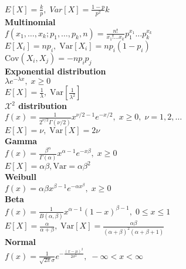\documentclass[10pt]{article} %
\begin{document}
\begin{multicols}{4}
{    \)\\
    \(
    E[X] = \frac{k}{p},\; Var[X] = \frac{1-p}{p^2}k
    \)\\
    {\small \textbf{Multinomial}}\\
    \(
    f(x_1,\dots,x_k;p_1,\dots,p_k,n) = \frac{n!}{x_1!\hdots x_k}p_1^{x_1}\hdots p_k^{x_k}
    \)\\
    \(
    E[X_i] = np_i,\; \text{Var}[X_i] = np_i(1-p_i)
    \)\\
    \(
    \text{Cov}(X_i,X_j) =-np_ip_j
    \)\\
    {\small \textbf{Exponential distribution}}\\
    \(
    \lambda e^{-\lambda x},\; x\geq 0
    \)\\
    \(
    E[X] = \frac{1}{\lambda},\; \text{Var}[\frac{1}{\lambda^2}]
    \)\\
    {\small \textbf{\(\mathcal{X}^2\) distribution}}\\
    {\small
    \(
    f(x) = \frac{1}{2^{\nu/2}\Gamma(\nu/2)}x^{\nu/2-1}e^{-x/2},\; x \geq 0,\; \nu = 1,2,\dots
    \)
    }\\
    \(
    E[X] = \nu,\; \text{Var}[X] = 2\nu
    \)\\
    {\small \textbf{Gamma}}\\
    \(
    f(x)=\frac{\beta^\alpha}{\Gamma(\alpha)} x^{\alpha-1}e^{-x\beta}, \; x \geq 0
    \)\\
    \(
    E[X] = \alpha\beta, \text{Var} = \alpha\beta^2
    \)\\
    {\small \textbf{Weibull}}\\
    \(
    f(x) = \alpha\beta x^{\beta-1}e^{-\alpha x^{\beta}},\; x \geq 0
    \)\\
    {\small \textbf{Beta}}\\
    \(
    f(x) = \frac{1}{B(\alpha,\beta)}x^{\alpha-1}(1-x)^{\beta-1},\; 0 \leq x \leq 1
    \)\\
    \(
    E[X] = \frac{\alpha}{\alpha+\beta},\; \text{Var}[X] = \frac{\alpha\beta}{(\alpha+\beta)^2(\alpha+\beta+1)}
    \)\\
    {\small \textbf{Normal}}\\
    \(
    f(x) = \frac{1}{\sqrt{2\pi}\sigma}e^{-\frac{(x-\mu)^2}{2\sigma^2}},\; -\infty < x < \infty
    \)\\
}
\end{multicols}
\end{document}
